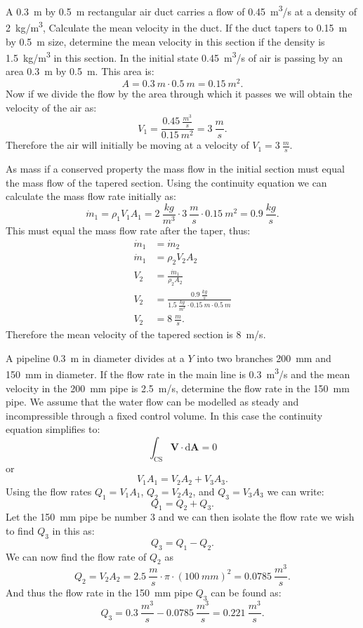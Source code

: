 
A \qty{0,3}{m} by \qty{0,5}{m} rectangular air duct carries a flow of \qty{0,45}{m^3/s} at a density of \qty{2}{kg/m^3}, Calculate the mean velocity in the duct. If the duct tapers to \qty{0,15}{m} by \qty{0,5}{m} size, determine the mean velocity in this section if the density is \qty{1,5}{kg/m^3} in this section.
\bigbreak
In the initial state \qty{0,45}{m^3/s} of air is passing by an area \qty{0,3}{m} by \qty{0,5}{m}. This area is:
\[ 
A = \qty{0,3}{m} \cdot \qty{0,5}{m} = \qty{0,15}{m^2} 
.\]
Now if we divide the flow by the area through which it passes we will obtain the velocity of the air as:
\[ 
V_1 = \frac{\qty{0,45}{\frac{m^3}{s}} }{\qty{0,15}{m^2} } = \qty{3}{\frac{m}{s}} 
.\]
Therefore the air will initially be moving at a velocity of $V_1 = \qty{3}{\frac{m}{s}}$. 

As mass if a conserved property the mass flow in the initial section must equal the mass flow of the tapered section. Using the continuity equation we can calculate the mass flow rate initially as:
\[ 
\dot{m}_1 = \rho_1 V_1 A_1 = \qty{2}{\frac{kg}{m^3}} \cdot \qty{3}{\frac{m}{s}} \cdot \qty{0,15}{m^2} = \qty{0,9}{\frac{kg}{s}}
.\]
This must equal the mass flow rate after the taper, thus:
\begin{align*}
  \dot{m}_1 &= \dot{m}_2 \\
  \dot{m}_1 &= \rho_2 V_2 A_2 \\
  V_2 &= \frac{\dot{m}_1}{\rho_2 A_2} \\
  V_2 &= \frac{\qty{0,9}{\frac{kg}{s}} }{\qty{1,5}{\frac{kg}{m^3}} \cdot \qty{0,15}{m} \cdot \qty{0,5}{m}} \\
  V_2 &= \qty{8}{\frac{m}{s}} 
.\end{align*}
Therefore the mean velocity of the tapered section is \qty{8}{m/s}. 


A pipeline \qty{0,3}{m} in diameter divides at a $Y$ into two branches \qty{200}{mm} and \qty{150}{mm} in diameter. If the flow rate in the main line is \qty{0,3}{m^3/s} and the mean velocity in the \qty{200}{mm} pipe is \qty{2,5}{m/s}, determine the flow rate in the \qty{150}{mm} pipe.
\bigbreak
We assume that the water flow can be modelled as steady and incompressible through a fixed control volume. In this case the continuity equation simplifies to:
\[ 
\int_{\mathrm{CS}} \textbf{V} \cdot \mathrm{d}\textbf{A} = 0
\]
or
\[ 
V_1 A_1 = V_2 A_2 + V_3 A_3
.\]
Using the flow rates $Q_1 = V_1 A_1$, $Q_2 = V_2 A_2$, and $Q_3 = V_3 A_3$ we can write:
\[ 
Q_1 = Q_2 + Q_3
.\]
Let the \qty{150}{mm} pipe be number 3 and we can then isolate the flow rate we wish to find $Q_3$ in this as:
\[ 
Q_3 = Q_1 - Q_2
.\]
We can now find the flow rate of $Q_2$ as
\[ 
Q_2 = V_2 A_2 = \qty{2,5}{\frac{m}{s}} \cdot \pi \cdot \left( \qty{100}{mm}  \right)^2 = \qty{0,0785}{\frac{m^3}{s}} 
.\]
And thus the flow rate in the \qty{150}{mm} pipe $Q_3$ can be found as:
\[ 
Q_3 = \qty{0,3}{\frac{m^3}{s}} - \qty{0,0785}{\frac{m^3}{s}} = \qty{0,221}{\frac{m^3}{s}} 
.\]


